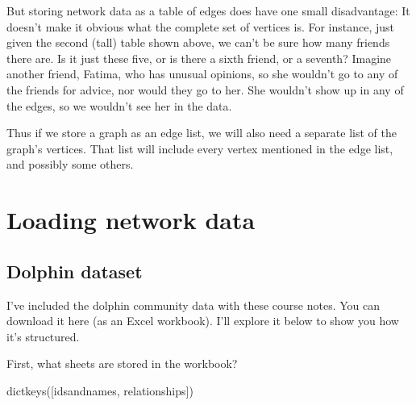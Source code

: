\documentclass[letterpaper,10pt,english]{jupyterBook}
\begin{document}
\sphinxAtStartPar
But storing network data as a table of edges does have one small disadvantage:  It doesn’t make it obvious what the complete set of vertices is.  For instance, just given the second (tall) table shown above, we can’t be sure how many friends there are.  Is it just these five, or is there a sixth friend, or a seventh?  Imagine another friend, Fatima, who has unusual opinions, so she wouldn’t go to any of the friends for advice, nor would they go to her.  She wouldn’t show up in any of the edges, so we wouldn’t see her in the data.

\sphinxAtStartPar
Thus if we store a graph as an edge list, we will also need a separate list of the graph’s vertices.  That list will include every vertex mentioned in the edge list, and possibly some others.


\section{Loading network data}
\label{\detokenize{chapter-15-networks:loading-network-data}}

\subsection{Dolphin dataset}
\label{\detokenize{chapter-15-networks:dolphin-dataset}}
\sphinxAtStartPar
I’ve included the dolphin community data with these course notes.  You can download it here (as an Excel workbook).  I’ll explore it below to show you how it’s structured.

\sphinxAtStartPar
First, what sheets are stored in the workbook?

\begin{sphinxVerbatim}[commandchars=\\\{\}]
   
     
\end{sphinxVerbatim}

\begin{sphinxVerbatim}[commandchars=\\\{\}]
dict\PYGZus{}keys([\PYGZsq{}ids\PYGZus{}and\PYGZus{}names\PYGZsq{}, \PYGZsq{}relationships\PYGZsq{}])
\end{sphinxVerbatim}
\end{document}
